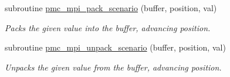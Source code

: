 \begin{DoxyCompactItemize}
subroutine \mbox{\hyperlink{namespacepmc__scenario_a93772962c3e78b32063cb735d357878a}{pmc\+\_\+mpi\+\_\+pack\+\_\+scenario}} (buffer, position, val)
\begin{DoxyCompactList}\small\item\em Packs the given value into the buffer, advancing position. \end{DoxyCompactList}\item 
subroutine \mbox{\hyperlink{namespacepmc__scenario_afddd83d6cfc65b32e3cce01d70ecdf85}{pmc\+\_\+mpi\+\_\+unpack\+\_\+scenario}} (buffer, position, val)
\begin{DoxyCompactList}\small\item\em Unpacks the given value from the buffer, advancing position. \end{DoxyCompactList}\end{DoxyCompactItemize}
